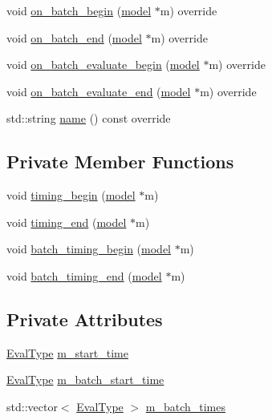 \begin{DoxyCompactItemize}
\item 
void \hyperlink{classlbann_1_1lbann__callback__timer_aa6b016b9fb470a7614ab4147ae105002}{on\+\_\+batch\+\_\+begin} (\hyperlink{classlbann_1_1model}{model} $\ast$m) override
\item 
void \hyperlink{classlbann_1_1lbann__callback__timer_aff885381753dfc63709531aebc827b0e}{on\+\_\+batch\+\_\+end} (\hyperlink{classlbann_1_1model}{model} $\ast$m) override
\item 
void \hyperlink{classlbann_1_1lbann__callback__timer_abef3c43404a7453a383fe47728d3283b}{on\+\_\+batch\+\_\+evaluate\+\_\+begin} (\hyperlink{classlbann_1_1model}{model} $\ast$m) override
\item 
void \hyperlink{classlbann_1_1lbann__callback__timer_a1a041e3b7cc2cfea68200d9467d3eaaf}{on\+\_\+batch\+\_\+evaluate\+\_\+end} (\hyperlink{classlbann_1_1model}{model} $\ast$m) override
\item 
std\+::string \hyperlink{classlbann_1_1lbann__callback__timer_a32a3b87744ee0fcac931e8e69358ece9}{name} () const override
\end{DoxyCompactItemize}
\subsection*{Private Member Functions}
\begin{DoxyCompactItemize}
\item 
void \hyperlink{classlbann_1_1lbann__callback__timer_a5eb2a9d5c0c2fe4a7d7f45369928e2fd}{timing\+\_\+begin} (\hyperlink{classlbann_1_1model}{model} $\ast$m)
\item 
void \hyperlink{classlbann_1_1lbann__callback__timer_a955e59858c6803e96b21fe494cdf3971}{timing\+\_\+end} (\hyperlink{classlbann_1_1model}{model} $\ast$m)
\item 
void \hyperlink{classlbann_1_1lbann__callback__timer_a6a8a59707a52b8b570b7605b90fdd159}{batch\+\_\+timing\+\_\+begin} (\hyperlink{classlbann_1_1model}{model} $\ast$m)
\item 
void \hyperlink{classlbann_1_1lbann__callback__timer_afbf58bd4e1b4c1bcae2e50f78c9507f0}{batch\+\_\+timing\+\_\+end} (\hyperlink{classlbann_1_1model}{model} $\ast$m)
\end{DoxyCompactItemize}
\subsection*{Private Attributes}
\begin{DoxyCompactItemize}
\item 
\hyperlink{base_8hpp_a3266f5ac18504bbadea983c109566867}{Eval\+Type} \hyperlink{classlbann_1_1lbann__callback__timer_a5e65e92eadce733120772d420ffbb7d5}{m\+\_\+start\+\_\+time}
\item 
\hyperlink{base_8hpp_a3266f5ac18504bbadea983c109566867}{Eval\+Type} \hyperlink{classlbann_1_1lbann__callback__timer_a56a597dea5c6649442311dc15ee6d06f}{m\+\_\+batch\+\_\+start\+\_\+time}
\item 
std\+::vector$<$ \hyperlink{base_8hpp_a3266f5ac18504bbadea983c109566867}{Eval\+Type} $>$ \hyperlink{classlbann_1_1lbann__callback__timer_ae20dcc6bf921444e2724478ba751ade1}{m\+\_\+batch\+\_\+times}
\end{DoxyCompactItemize}
